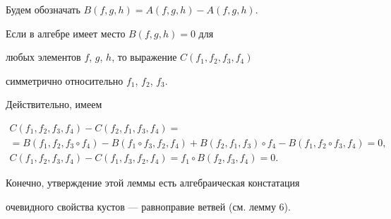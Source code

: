 Будем обозначать $B(f,g,h)=A(f,g,h)-A(f,g,h)$.





\begin{lem} Если в алгебре имеет место $B(f,g,h)=0$ для


любых элементов $f$, $g$, $h$, то выражение $C(f_1,f_2,f_3,f_4)$


симметрично относительно $f_1$, $f_2$, $f_3$.


\end{lem}





\begin{pf} Действительно, имеем


\begin{gather*}


C(f_1,f_2,f_3,f_4)-C(f_2,f_1,f_3,f_4)=\\


%


=B(f_1,f_2,f_3 \circ f_4)-B(f_1 \circ f_3,f_2,f_4)+


B(f_2,f_1,f_3) \circ f_4 - B(f_1,f_2 \circ f_3,f_4)=0,\\


%


C(f_1,f_2,f_3,f_4)-C(f_1,f_3,f_2,f_4)= f_1 \circ B(f_2,f_3,f_4)=0.


\end{gather*}


Конечно, утверждение этой леммы есть алгебраическая констатация


очевидного свойства кустов --- равноправие ветвей (см. лемму 6).


\end{pf}





